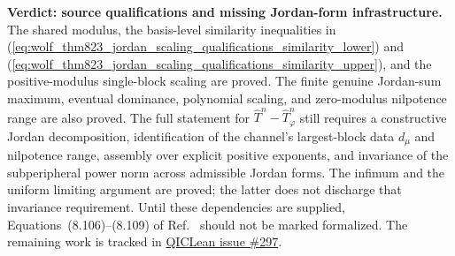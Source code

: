 \documentclass{article}
\begin{document}
\textbf{Verdict: source qualifications and missing Jordan-form
infrastructure.} The shared modulus, the basis-level similarity inequalities
in
(\ref{eq:wolf_thm823_jordan_scaling_qualifications_similarity_lower}) and
(\ref{eq:wolf_thm823_jordan_scaling_qualifications_similarity_upper}), and the
positive-modulus single-block scaling are proved. The finite genuine
Jordan-sum maximum, eventual dominance, polynomial scaling, and zero-modulus
nilpotence range are also proved. The full statement for
$\widehat T^n-\widehat T_\varphi^n$ still requires a constructive Jordan
decomposition, identification of the channel's largest-block data $d_\mu$
and nilpotence range, assembly over explicit positive exponents, and invariance of the subperipheral power norm across admissible Jordan
forms. The infimum and the uniform limiting argument are proved; the latter
does not discharge that invariance requirement. Until these dependencies are supplied,
Equations~(8.106)--(8.109) of Ref.~\cite{Wolf2012Quantum} should not be marked
formalized. The remaining work is tracked in
\href{https://github.com/LionSR/QICLean/issues/297}{QICLean issue \#297}.



\end{document}
